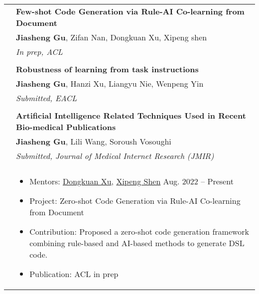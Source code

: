 \documentclass[letterpaper, 10pt]{article}
\begin{document}
\begin{longtable}{p{1.3in}p{4.8in}}

\nohyphens{\color{black}{Publications}}
& \textbf{Few-shot Code Generation via Rule-AI Co-learning from Document\label{few-shot_code}}  \\
& \textbf{Jiasheng Gu}, Zifan Nan, Dongkuan Xu, Xipeng shen \\
& \textit{In prep, ACL}\\
& \\


& \textbf{Robustness of learning from task instructions \label{robustness_instruction}} \\
& \textbf{Jiasheng Gu}, Hanzi Xu, Liangyu Nie, Wenpeng Yin \\
& \textit{Submitted, EACL}\\
& \\

& \textbf{Artificial Intelligence Related Techniques Used in Recent Bio-medical Publications} \label{JMIR} \\
& \textbf{Jiasheng Gu}, Lili Wang, Soroush Vosoughi \\
& \textit{Submitted, Journal of Medical Internet Research (JMIR)}\\
& \\


\nohyphens{\color{black}{Research Experience}} 

&  \begin{itemize}[leftmargin=10pt, itemsep=-5pt, topsep=0pt,before=\textbf{North Carolina State University}]
    \item Mentors: \href{http://personal.psu.edu/dux19/}{Dongkuan Xu}, \href{https://people.engr.ncsu.edu/xshen5/}{Xipeng Shen} \hfill Aug. 2022 -- Present 
    \item Project: Zero-shot Code Generation via Rule-AI Co-learning from Document
    \item Contribution: Proposed a zero-shot code generation framework combining rule-based and AI-based methods to generate DSL code.
    \item Publication: ACL in prep
  \end{itemize}\\ 


\end{longtable}
\end{document}
